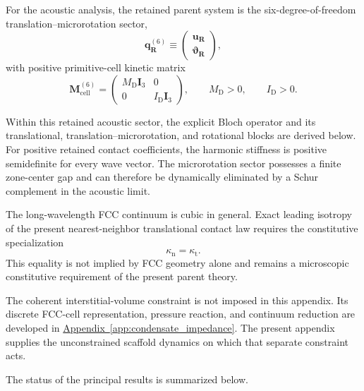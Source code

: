 For the acoustic analysis, the retained parent system is the six-degree-of-freedom translation--microrotation sector,
\begin{equation}
    \mathbf{q}_{\mathbf{R}}^{(6)}
    \equiv
    \begin{pmatrix}
        \mathbf{u}_{\mathbf{R}}\\
        \boldsymbol{\vartheta}_{\mathbf{R}}
    \end{pmatrix},
\end{equation}
with positive primitive-cell kinetic matrix
\begin{equation}
    \mathbf{M}_{\mathrm{cell}}^{(6)}
    =
    \begin{pmatrix}
        M_{\mathrm{D}}\mathbf{I}_3 & 0\\
        0 & I_{\mathrm{D}}\mathbf{I}_3
    \end{pmatrix},
    \qquad
    M_{\mathrm{D}}>0,
    \qquad
    I_{\mathrm{D}}>0.
\end{equation}

Within this retained acoustic sector, the explicit Bloch operator and its translational, translation--microrotation, and rotational blocks are derived below. For positive retained contact coefficients, the harmonic stiffness is positive semidefinite for every wave vector. The microrotation sector possesses a finite zone-center gap and can therefore be dynamically eliminated by a Schur complement in the acoustic limit.

The long-wavelength FCC continuum is cubic in general. Exact leading isotropy of the present nearest-neighbor translational contact law requires the constitutive specialization
\begin{equation}
    \kappa_{\mathrm{n}}=\kappa_{\mathrm{t}}.
\end{equation}
This equality is not implied by FCC geometry alone and remains a microscopic constitutive requirement of the present parent theory.

The coherent interstitial-volume constraint is not imposed in this appendix. Its discrete FCC-cell representation, pressure reaction, and continuum reduction are developed in \hyperref[app:condensate_impedance]{Appendix~\ref*{app:condensate_impedance}}. The present appendix supplies the unconstrained scaffold dynamics on which that separate constraint acts.

The status of the principal results is summarized below.

